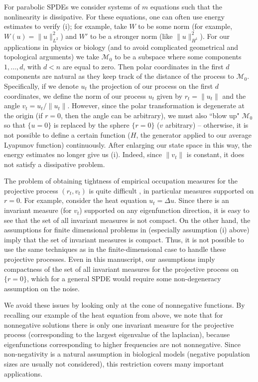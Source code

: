 \documentclass[final]{amsart}
\numberwithin{thm}{section}
\numberwithin{equation}{section}
\newcommand{\mcM}{\mathcal{M}}
\begin{document}
For parabolic SPDEs we consider systems of $m$ equations such that the nonlinearity is dissipative. For these equations, one can often use energy estimates to verify (i); for example, take $W$ to be some norm (for example, $W(u) = \|u\|_{L^2}^2$) and $W'$ to be a stronger norm (like $\|u\|_{H^1}^2$).
For our applications in physics or biology (and to avoid complicated geometrical and topological arguments) we 
take $\mcM_0$ to be a subspace where some components $1, \ldots, d$, with $d < n$ are equal to zero. Then polar coordinates in the first $d$ components are natural as they keep track of the distance of the process to $\mcM_0$.  
Specifically, if we denote $u_t$ the projection of our process on the first $d$ coordinates, we define the norm of our process $u_t$ given by $r_t = \|u_t\|$ and the angle $v_t = u_t/\|u_t\|$. However, since the polar transformation is degenerate at the origin (if $r = 0$, then the angle can be arbitrary), we must also ``blow up" $\mcM_0$ so that $\{u=0\}$ is replaced by the sphere $\{r=0\}$ ($v$ arbitrary) -- otherwise, it is not possible to define a certain function ($H$, the generator applied to our average Lyapunov function) continuously. After enlarging our state space in this way, the energy estimates no longer give us (i).
Indeed, since $\|v_t\|$ is constant, it does not satisfy a dissipative problem.

The problem of obtaining tightness of empirical occupation measures for the projective process $(r_t,v_t)$ is quite difficult \cite{projective-process-1, projective-process-2}, in particular measures supported on $r = 0$. For example, consider the heat equation $u_t = \Delta u$. Since there is an invariant measure (for $v_t$) supported on any eigenfunction direction,
 it is easy to see that the set of all invariant measures is not compact. On the other hand, the assumptions for finite dimensional problems in \cite{persistence, extinction} (especially assumption (i) above) imply that the set of invariant measures is compact. Thus, it is not possible to use the same techniques as in the finite-dimensional case to handle these projective processes. Even in this manuscript, our assumptions imply compactness of the set of all invariant measures for the projective process on $\{r =0\}$, which for a general SPDE would require some non-degeneracy assumption on the noise.

 We avoid these issues by looking only at the cone of nonnegative functions. By recalling our example of the heat equation from above, we note that for nonnegative solutions there is only one invariant measure for the projective process (corresponding to the largest eigenvalue of the laplacian), because eigenfunctions corresponding to higher frequencies are not nonnegative.  Since non-negativity is a natural assumption in biological models (negative population sizes are usually not considered), this restriction covers many important applications.
 
\end{document}
